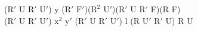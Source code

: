 ($\text{R}'$ U $\text{R}'$ $\text{U}'$) y ($\text{R}'$ $\text{F}'$)($\text{R}^2$ $\text{U}'$)($\text{R}'$ U $\text{R}'$ F)(R F)\\
($\text{R}'$ U $\text{R}'$ $\text{U}'$) $\text{x}^2$ $\text{y}'$ ($\text{R}'$ U $\text{R}'$ $\text{U}'$) l (R $\text{U}'$ $\text{R}'$ U) R U\\
